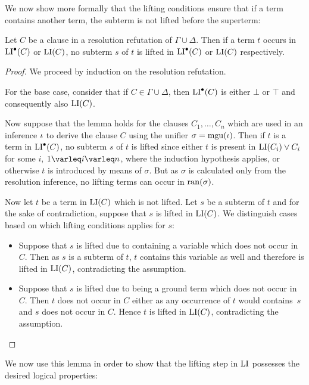 We now show more formally that the lifting conditions ensure that if a term contains another term, the subterm is not lifted before the superterm:


\begin{lemma}
	\label{lemma:lifting_conditions}
	Let $C$ be a clause in a resolution refutation of $\Gamma \cup \Delta$.
	Then if a term $t$ occurs in $\operatorname{LI}^\bullet(C)$ or $\operatorname{LI}(C)$, no subterm $s$ of $t$ is lifted in $\operatorname{LI}^\bullet(C)$ or $\operatorname{LI}(C)$ respectively.
\end{lemma}
\begin{proof}
	We proceed by induction on the resolution refutation.

	For the base case, consider that if $C \in \Gamma \cup \Delta$, then $\operatorname{LI}^\bullet(C)$ is either $\bot$ or $\top$ and consequently also $\operatorname{LI}(C)$.

	Now suppose that the lemma holds for the clauses $C_1, \dots, C_n$ which are used in an inference $\iota$ to derive the clause $C$ using the unifier $\sigma = \operatorname{mgu}(\iota)$.
	Then if $t$ is a term in $\operatorname{LI}^\bullet(C)$, no subterm $s$ of $t$ is lifted since either $t$ is present in $\operatorname{LI}(C_i) \lor C_i$ for some $i$, $1\varleq i \varleq n$, where the induction hypothesis applies,
	or otherwise $t$ is introduced by means of $\sigma$. But as $\sigma$ is calculated only from the resolution inference, no lifting terms can occur in $\operatorname{ran}(\sigma)$.

	Now let $t$ be a term in $\operatorname{LI}(C)$ which is not lifted. Let $s$ be a subterm of $t$ and for the sake of contradiction, suppose that $s$ is lifted in $\operatorname{LI}(C)$. We distinguish cases based on which lifting conditions applies for $s$:
	\begin{itemize}
		\item Suppose that $s$ is lifted due to containing a variable which does not occur in\nolinebreak{} $C$.
			Then as $s$ is a subterm of $t$, $t$ contains this variable as well and therefore is lifted in $\operatorname{LI}(C)$, contradicting the assumption.

		\item Suppose that $s$ is lifted due to being a ground term which does not occur in\nolinebreak{} $C$.
			Then $t$ does not occur in $C$ either as any occurrence of $t$ would contains~$s$ and $s$ does not occur in $C$.
			Hence $t$ is lifted in $\operatorname{LI}(C)$, contradicting the assumption.
			\qedhere
	\end{itemize}
\end{proof}

We now use this lemma in order to 
show that the lifting step in $\operatorname{LI}$ possesses the desired logical properties:

